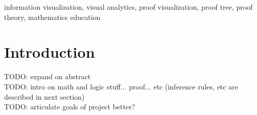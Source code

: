 \documentclass[conference]{IEEEtran}
\begin{document}
\newcommand{\sentencefive}{The proof visualization tool allows either open exploration of a proof or a directed walk-through, revealing supplementary information to serve as a form of discourse as the nodes are visited.}


\newcommand{\sentencesix}{This work provides a tool for gaining understanding of the structure of proofs, insight into the processes used in constructing such proofs, and also serves as a starting point for visualizations of proof trees in more complicated logics.}




\begin{abstract}
    \sentenceone{} \sentencetwo{} \sentencethree{} \sentencefour{} \sentencefive{} \sentencesix{}
\end{abstract}


\begin{IEEEkeywords}
    information visualization, visual analytics, proof visualization, proof tree, proof theory, mathematics education
\end{IEEEkeywords}


\section{Introduction}



TODO: expand on abstract \\

TODO: intro on math and logic stuff... proof... etc (inference rules, etc are described in next section) \\

TODO: articulate goals of project better? \\
\end{document}
